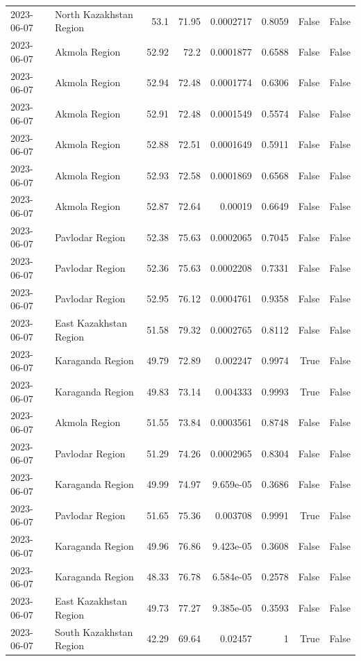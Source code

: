 \begin{table}
\begin{tabular}{llrrrrrr}
2023-06-07 & North Kazakhstan Region & 53.1 & 71.95 & 0.0002717 & 0.8059 & False & False \\
2023-06-07 & Akmola Region & 52.92 & 72.2 & 0.0001877 & 0.6588 & False & False \\
2023-06-07 & Akmola Region & 52.94 & 72.48 & 0.0001774 & 0.6306 & False & False \\
2023-06-07 & Akmola Region & 52.91 & 72.48 & 0.0001549 & 0.5574 & False & False \\
2023-06-07 & Akmola Region & 52.88 & 72.51 & 0.0001649 & 0.5911 & False & False \\
2023-06-07 & Akmola Region & 52.93 & 72.58 & 0.0001869 & 0.6568 & False & False \\
2023-06-07 & Akmola Region & 52.87 & 72.64 & 0.00019 & 0.6649 & False & False \\
2023-06-07 & Pavlodar Region & 52.38 & 75.63 & 0.0002065 & 0.7045 & False & False \\
2023-06-07 & Pavlodar Region & 52.36 & 75.63 & 0.0002208 & 0.7331 & False & False \\
2023-06-07 & Pavlodar Region & 52.95 & 76.12 & 0.0004761 & 0.9358 & False & False \\
2023-06-07 & East Kazakhstan Region & 51.58 & 79.32 & 0.0002765 & 0.8112 & False & False \\
2023-06-07 & Karaganda Region & 49.79 & 72.89 & 0.002247 & 0.9974 & True & False \\
2023-06-07 & Karaganda Region & 49.83 & 73.14 & 0.004333 & 0.9993 & True & False \\
2023-06-07 & Akmola Region & 51.55 & 73.84 & 0.0003561 & 0.8748 & False & False \\
2023-06-07 & Pavlodar Region & 51.29 & 74.26 & 0.0002965 & 0.8304 & False & False \\
2023-06-07 & Karaganda Region & 49.99 & 74.97 & 9.659e-05 & 0.3686 & False & False \\
2023-06-07 & Pavlodar Region & 51.65 & 75.36 & 0.003708 & 0.9991 & True & False \\
2023-06-07 & Karaganda Region & 49.96 & 76.86 & 9.423e-05 & 0.3608 & False & False \\
2023-06-07 & Karaganda Region & 48.33 & 76.78 & 6.584e-05 & 0.2578 & False & False \\
2023-06-07 & East Kazakhstan Region & 49.73 & 77.27 & 9.385e-05 & 0.3593 & False & False \\
2023-06-07 & South Kazakhstan Region & 42.29 & 69.64 & 0.02457 & 1 & True & False \\

\end{tabular}
\end{table}
